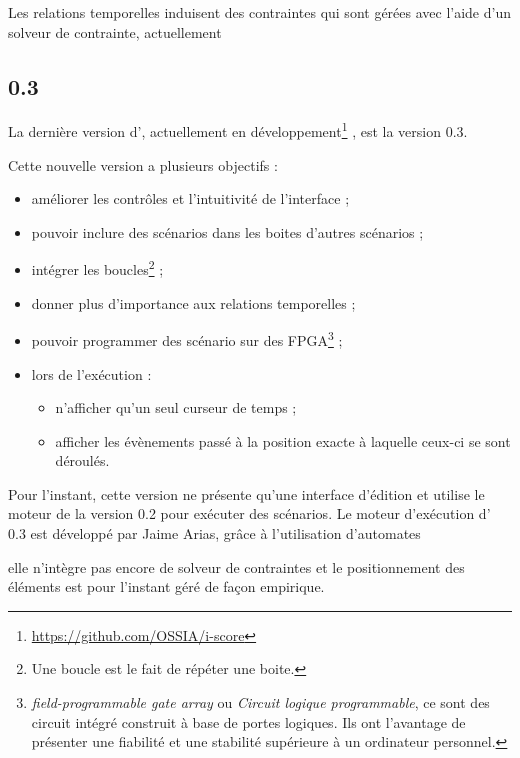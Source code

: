 Les relations temporelles induisent des contraintes qui sont gérées avec l'aide d'un solveur de contrainte, actuellement \gecode{} 


\subsection{\iscore{} 0.3}%

La dernière version d'\iscore{}, actuellement en développement\footnote{\url{https://github.com/OSSIA/i-score}} \iscore{}, est la version 0.3.

Cette nouvelle version a plusieurs objectifs :

\begin{itemize}
    \item améliorer les contrôles et l'intuitivité de l'interface ;
    \item pouvoir inclure des scénarios dans les boites d'autres scénarios ;
    \item intégrer les boucles\footnote{Une boucle est le fait de répéter une boite.} ;
    \item donner plus d'importance aux relations temporelles ;
    \item pouvoir programmer des scénario sur des FPGA\footnote{\emph{field-programmable gate array} ou \emph{Circuit logique programmable}, ce sont des circuit intégré construit à base de portes logiques. Ils ont l'avantage de présenter une fiabilité et une stabilité supérieure à un ordinateur personnel.} ;
    \item lors de l'exécution :
    \begin{itemize}
        \item n'afficher qu'un seul curseur de temps ;
        \item afficher les évènements passé à la position exacte à laquelle ceux-ci se sont déroulés.
    \end{itemize}
\end{itemize}

Pour l'instant, cette version ne présente qu'une interface d'édition et utilise le moteur de la version 0.2 pour exécuter des scénarios. Le moteur d'exécution d'\iscore{} 0.3 est développé par Jaime Arias, grâce à l'utilisation d'automates

elle n'intègre pas encore de solveur de contraintes et le positionnement des éléments est pour l'instant géré de façon empirique.

